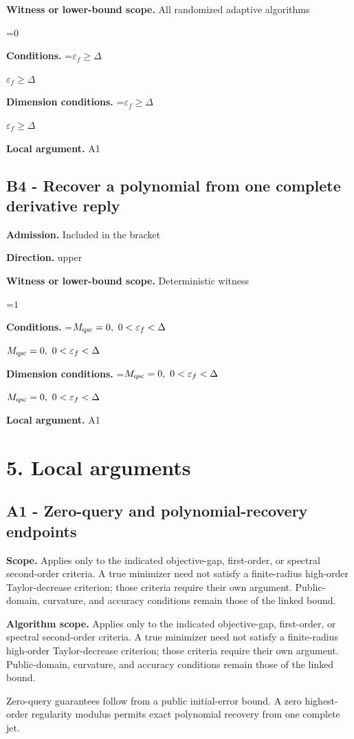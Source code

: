 \documentclass[10pt,a4paper]{article}
\newcommand{\AtlasMath}[1]{\par\begingroup\centering\setbox0=\hbox{$\displaystyle #1$}\ifdim\wd0>1.4\linewidth\typeout{ATLAS WIDE FORMULA: \the\wd0}\fi\ifdim\wd0>\linewidth\resizebox{\linewidth}{!}{\box0}\else\box0\fi\par\endgroup}
\newcommand{\AtlasInlineMath}[1]{\begingroup\setbox0=\hbox{$#1$}\ifdim\wd0>.4\linewidth\endgroup\AtlasMath{#1}\else\endgroup$#1$\fi}
\begin{document}
\textbf{Witness or lower-bound scope.} All randomized adaptive algorithms

\AtlasMath{0}
\textbf{Conditions.} \AtlasInlineMath{\varepsilon_f\ge\Delta}

\textbf{Dimension conditions.} \AtlasInlineMath{\varepsilon_f\ge\Delta}

\textbf{Local argument.} A1

\subsection{B4 - Recover a polynomial from one complete derivative reply}
\textbf{Admission.} Included in the bracket

\textbf{Direction.} upper

\textbf{Witness or lower-bound scope.} Deterministic witness

\AtlasMath{1}
\textbf{Conditions.} \AtlasInlineMath{M_{\rm qsc}=0,\ 0<\varepsilon_f<\Delta}

\textbf{Dimension conditions.} \AtlasInlineMath{M_{\rm qsc}=0,\ 0<\varepsilon_f<\Delta}

\textbf{Local argument.} A1

\section{5. Local arguments}
\subsection{A1 - Zero-query and polynomial-recovery endpoints}
\textbf{Scope.} Applies only to the indicated objective-gap, first-order, or spectral second-order criteria. A true minimizer need not satisfy a finite-radius high-order Taylor-decrease criterion; those criteria require their own argument. Public-domain, curvature, and accuracy conditions remain those of the linked bound.

\textbf{Algorithm scope.} Applies only to the indicated objective-gap, first-order, or spectral second-order criteria. A true minimizer need not satisfy a finite-radius high-order Taylor-decrease criterion; those criteria require their own argument. Public-domain, curvature, and accuracy conditions remain those of the linked bound.

Zero-query guarantees follow from a public initial-error bound. A zero highest-order regularity modulus permits exact polynomial recovery from one complete jet.
\end{document}
